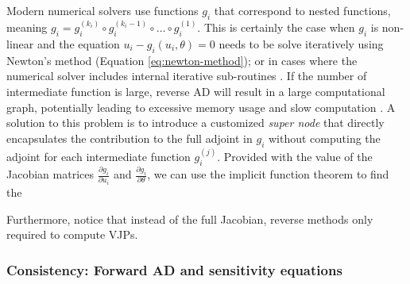Modern numerical solvers use functions $g_i$ that correspond to nested functions, meaning $g_i = g_i^{(k_i)} \circ g_i^{(k_i-1)} \circ \ldots \circ g_i^{(1)} $. 
This is certainly the case when $g_{i}$ is non-linear and the equation $u_{i} - g_{i}(u_i , \theta) = 0$ needs to be solve iteratively using Newton's method (Equation \eqref{eq:newton-method}); or in cases where the numerical solver includes internal iterative sub-routines \cite{Alexe_Sandu_2009}.
If the number of intermediate function is large, reverse AD will result in a large computational graph, potentially leading to excessive memory usage and slow computation \cite{Margossian_2018, Alexe_Sandu_2009}.
A solution to this problem is to introduce a customized \textit{super node} that directly encapsulates the contribution to the full adjoint in $g_i$ without computing the adjoint for each intermediate function $g_i^{(j)}$.
Provided with the value of the Jacobian matrices $\frac{\partial g_i}{\partial u_i}$ and $\frac{\partial g_i}{\partial \theta}$, we can use the implicit function theorem to find the 

Furthermore, notice that instead of the full Jacobian, reverse methods only required to compute VJPs. 



\subsubsection{Consistency: Forward AD and sensitivity equations}

